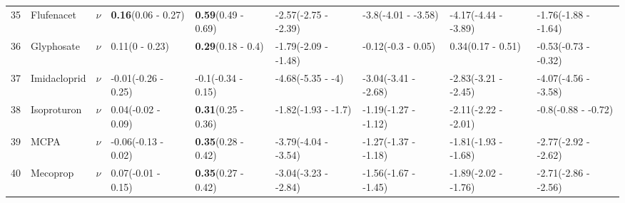 \begin{longtable}{lp{2cm}p{0.6cm}p{1.8cm}p{1.8cm}p{1.8cm}p{1.8cm}p{1.8cm}p{1.8cm}}
  35 & Flufenacet & $\nu$ & \textbf{0.16}\newline (0.06 - 0.27) & \textbf{0.59}\newline (0.49 - 0.69) & -2.57\newline (-2.75 - -2.39) & -3.8\newline (-4.01 - -3.58) & -4.17\newline (-4.44 - -3.89) & -1.76\newline (-1.88 - -1.64) \\ 
  36 & Glyphosate & $\nu$ & 0.11\newline (0 - 0.23) & \textbf{0.29}\newline (0.18 - 0.4) & -1.79\newline (-2.09 - -1.48) & -0.12\newline (-0.3 - 0.05) & 0.34\newline (0.17 - 0.51) & -0.53\newline (-0.73 - -0.32) \\ 
  37 & Imidacloprid & $\nu$ & -0.01\newline (-0.26 - 0.25) & -0.1\newline (-0.34 - 0.15) & -4.68\newline (-5.35 - -4) & -3.04\newline (-3.41 - -2.68) & -2.83\newline (-3.21 - -2.45) & -4.07\newline (-4.56 - -3.58) \\ 
  38 & Isoproturon & $\nu$ & 0.04\newline (-0.02 - 0.09) & \textbf{0.31}\newline (0.25 - 0.36) & -1.82\newline (-1.93 - -1.7) & -1.19\newline (-1.27 - -1.12) & -2.11\newline (-2.22 - -2.01) & -0.8\newline (-0.88 - -0.72) \\ 
  39 & MCPA & $\nu$ & -0.06\newline (-0.13 - 0.02) & \textbf{0.35}\newline (0.28 - 0.42) & -3.79\newline (-4.04 - -3.54) & -1.27\newline (-1.37 - -1.18) & -1.81\newline (-1.93 - -1.68) & -2.77\newline (-2.92 - -2.62) \\ 
  40 & Mecoprop & $\nu$ & 0.07\newline (-0.01 - 0.15) & \textbf{0.35}\newline (0.27 - 0.42) & -3.04\newline (-3.23 - -2.84) & -1.56\newline (-1.67 - -1.45) & -1.89\newline (-2.02 - -1.76) & -2.71\newline (-2.86 - -2.56) \\ 

\end{longtable}

